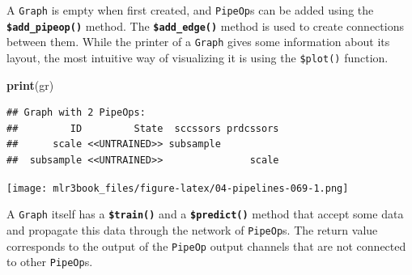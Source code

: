 \documentclass[]{article}
\newenvironment{Shaded}{\begin{snugshade}}{\end{snugshade}}
\newcommand{\DataTypeTok}[1]{\textcolor[rgb]{0.13,0.29,0.53}{#1}}
\newcommand{\FloatTok}[1]{\textcolor[rgb]{0.00,0.00,0.81}{#1}}
\newcommand{\KeywordTok}[1]{\textcolor[rgb]{0.13,0.29,0.53}{\textbf{#1}}}
\newcommand{\NormalTok}[1]{#1}
\newcommand{\OperatorTok}[1]{\textcolor[rgb]{0.81,0.36,0.00}{\textbf{#1}}}
\newcommand{\OtherTok}[1]{\textcolor[rgb]{0.56,0.35,0.01}{#1}}
\newcommand{\StringTok}[1]{\textcolor[rgb]{0.31,0.60,0.02}{#1}}
\renewenvironment{Shaded} {\begin{snugshade}\small} {\end{snugshade}}
\begin{document}
A \texttt{Graph} is empty when first created, and \texttt{PipeOp}s can be added using the \textbf{\texttt{\$add\_pipeop()}} method.
The \textbf{\texttt{\$add\_edge()}} method is used to create connections between them.
While the printer of a \texttt{Graph} gives some information about its layout, the most intuitive way of visualizing it is using the \texttt{\$plot()} function.

\begin{Shaded}
\end{Shaded}

\begin{Shaded}
\begin{Highlighting}[]
\KeywordTok{print}\NormalTok{(gr)}
\end{Highlighting}
\end{Shaded}

\begin{verbatim}
## Graph with 2 PipeOps:
##         ID         State  sccssors prdcssors
##      scale <<UNTRAINED>> subsample          
##  subsample <<UNTRAINED>>               scale
\end{verbatim}

\begin{Shaded}
\end{Shaded}

\texttt{[image: mlr3book\_files/figure-latex/04-pipelines-069-1.png]}

A \texttt{Graph} itself has a \textbf{\texttt{\$train()}} and a \textbf{\texttt{\$predict()}} method that accept some data and propagate this data through the network of \texttt{PipeOp}s.
The return value corresponds to the output of the \texttt{PipeOp} output channels that are not connected to other \texttt{PipeOp}s.
\end{document}
